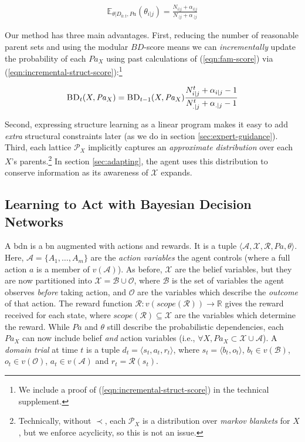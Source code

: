 \documentclass{article}
\newcommand{\bn}{{\sc bn}}
\newcommand{\bdn}{{\sc bdn}}
\newcommand{\Pa}{\mathit{Pa}}
\begin{document}
	\begin{equation}
	\label{eqn:expected-params}
	\begin{aligned}
	\mathbb{E}_{\theta | D_{0:t}, \Pa} (\theta_{i | j}) = \frac{N_{i | j} + \alpha_{i | j}}{N_{. | j} + \alpha_{. | j}}
	\end{aligned}
	\end{equation}
	
	Our method has three main advantages. First, reducing the number of reasonable parent sets and using the modular $BD$-score means we can \emph{incrementally} update the probability of each $Pa_X$ using past calculations of (\ref{eqn:fam-score}) via (\ref{eqn:incremental-struct-score}):\footnote{We include a proof of (\ref{eqn:incremental-struct-score}) in the technical supplement.}
	
	\begin{equation}
	\label{eqn:incremental-struct-score}
	\textsc{BD}_{t}(X, \Pa_X) = \textsc{BD}_{t-1}(X, \Pa_X) \frac{N^{t}_{i|j} + \alpha_{i | j} - 1}{N^{t}_{.|j} + \alpha_{.|j} - 1}
	\end{equation}
	
	Second, expressing structure learning as a linear program makes it easy to add \emph{extra} structural constraints later (as we do in section \ref{sec:expert-guidance}). Third, each lattice $\mathcal{P}_X$ implicitly captures an \emph{approximate distribution} over each $X$'s parents.\footnote{Technically, without $\prec$, each $\mathcal{P}_X$ is a distribution over \emph{markov blankets} for $X$, but we enforce acyclicity, so this is not an issue.} In section \ref{sec:adapting}, the agent uses this distribution to conserve information as its awareness of $\mathcal{X}$ expands.
	
	\subsection{Learning to Act with Bayesian Decision Networks}
	A \bdn{} \cite{russell_artificial_2002} is a \bn{} augmented with actions and rewards. It is a tuple $\langle \mathcal{A}, \mathcal{X}, \mathcal{R}, Pa, \theta \rangle$. Here, $\mathcal{A} = \{ A_1, \dots , A_m \}$ are the \emph{action variables} the agent controls (where a full action $a$ is a member of  $v(\mathcal{A})$). As before, $\mathcal{X}$ are the belief variables, but they are now partitioned into $\mathcal{X} = \mathcal{B} \cup \mathcal{O}$, where $\mathcal{B}$ is the set of variables the agent observes \emph{before} taking action, and $\mathcal{O}$ are the variables which describe the \emph{outcome} of that action. The reward function $\mathcal{R} : v(scope(\mathcal{R})) \rightarrow \mathds{R}$ gives the reward received for each state, where $scope(\mathcal{R}) \subseteq \mathcal{X}$ are the variables which determine the reward. While $\Pa$ and $\theta$ still describe the probabilistic dependencies, each $\Pa_X$ can now include belief \emph{and} action variables (i.e., $\forall X, \Pa_X \subset \mathcal{X} \cup \mathcal{A}$). A \emph{domain trial} at time $t$ is a tuple $d_t = \langle s_t, a_t, r_t \rangle$, where $s_t = \langle b_t, o_t \rangle$, $b_t \in v(\mathcal{B})$, $o_t \in v(\mathcal{O})$, $a_t \in v(\mathcal{A})$ and $r_t = \mathcal{R}(s_t)$. 
		
\end{document}

